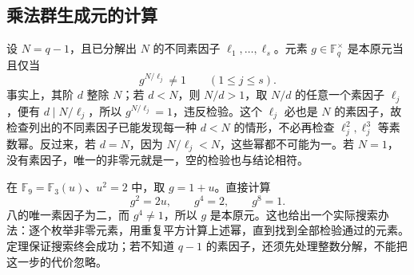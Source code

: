 \subsection{乘法群生成元的计算}
\label{b1:subsec:1702:04}

设 \(N=q-1\)，且已分解出 \(N\) 的不同素因子 \(\ell_1,\ldots,\ell_s\)。元素 \(g\in\mathbb F_q^\times\) 是本原元当且仅当
\begin{equation}\label{b1:eq:primitive-finite-field-test}
	g^{N/\ell_j}\ne1\qquad(1\leq j\leq s).
\end{equation}
事实上，其阶 \(d\) 整除 \(N\)；若 \(d<N\)，则 \(N/d>1\)，取 \(N/d\) 的任意一个素因子 \(\ell_j\)，便有 \(d\mid N/\ell_j\)，所以 \(g^{N/\ell_j}=1\)，违反检验。这个 \(\ell_j\) 必也是 \(N\) 的素因子，故检查列出的不同素因子已能发现每一种 \(d<N\) 的情形，不必再检查 \(\ell_j^2,\ell_j^3\) 等素数幂。反过来，若 \(d=N\)，因为 \(N/\ell_j<N\)，这些幂都不可能为一。若 \(N=1\)，没有素因子，唯一的非零元就是一，空的检验也与结论相符。

\ProseParagraphBreak
在 \(\mathbb F_9=\mathbb F_3(u)\)、\(u^2=2\) 中，取 \(g=1+u\)。直接计算
\[
	g^2=2u,\qquad g^4=2,\qquad g^8=1.
\]
八的唯一素因子为二，而 \(g^4\ne1\)，所以 \(g\) 是本原元。这也给出一个实际搜索办法：逐个枚举非零元素，用重复平方计算上述幂，直到找到全部检验通过的元素。定理保证搜索终会成功；若不知道 \(q-1\) 的素因子，还须先处理整数分解，不能把这一步的代价忽略。
